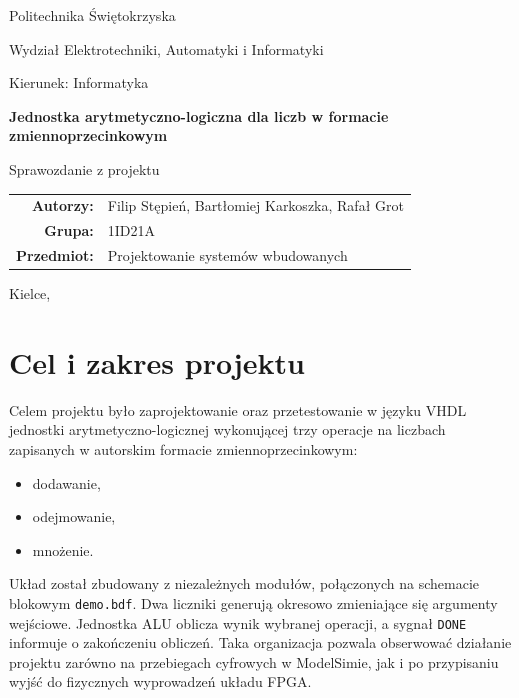 \documentclass[12pt,a4paper]{article}
\newcommand{\projekt}{Jednostka arytmetyczno-logiczna dla liczb w formacie zmiennoprzecinkowym}
\newcommand{\autorzy}{Filip Stępień, Bartłomiej Karkoszka, Rafał Grot}
\newcommand{\grupa}{1ID21A}
\begin{document}

\begin{titlepage}
    \centering
    \vspace*{1.4cm}
    {\Large Politechnika Świętokrzyska\par}
    \vspace{0.35cm}
    {\large Wydział Elektrotechniki, Automatyki i Informatyki\par}
    \vspace{0.2cm}
    {\large Kierunek: Informatyka\par}

    \vfill
    {\Huge\bfseries \projekt\par}
    \vspace{0.8cm}
    {\Large Sprawozdanie z projektu\par}
    \vfill

    \begin{tabular}{>{\bfseries}rl}
        Autorzy: & \autorzy \\
        Grupa: & \grupa \\
        Przedmiot: & Projektowanie systemów wbudowanych \\
    \end{tabular}

    \vfill
    {\large Kielce, \the\year\par}
\end{titlepage}

\tableofcontents
\clearpage
{}

\section{Cel i zakres projektu}

Celem projektu było zaprojektowanie oraz przetestowanie w języku VHDL
jednostki arytmetyczno-logicznej wykonującej trzy operacje na liczbach
zapisanych w autorskim formacie zmiennoprzecinkowym:

\begin{itemize}
    \item dodawanie,
    \item odejmowanie,
    \item mnożenie.
\end{itemize}

Układ został zbudowany z niezależnych modułów, połączonych na schemacie
blokowym \texttt{demo.bdf}. Dwa liczniki generują okresowo zmieniające się
argumenty wejściowe. Jednostka ALU oblicza wynik wybranej operacji, a sygnał
\texttt{DONE} informuje o zakończeniu obliczeń. Taka organizacja pozwala
obserwować działanie projektu zarówno na przebiegach cyfrowych w ModelSimie,
jak i po przypisaniu wyjść do fizycznych wyprowadzeń układu FPGA.
\end{document}
